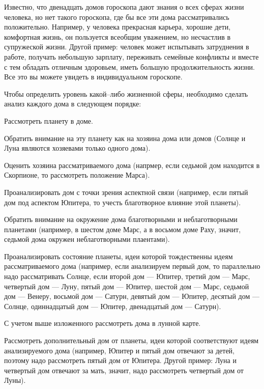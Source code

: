 Известно, что двенадцать домов гороскопа дают знания о всех сферах жизни человека, но нет такого гороскопа, где бы все эти дома рассматривались положительно. Например, у человека прекрасная карьера, хорошие дети, комфортная жизнь, он пользуется всеобщим уважением, но несчастлив в супружеской жизни. Другой пример: человек может испытывать затруднения в работе, получать небольшую зарплату, переживать семейные конфликты и вместе с тем обладать отличным здоровьем, иметь большую продолжительность жизни. Все это вы можете увидеть в индивидуальном гороскопе.

Чтобы определить уровень какой--либо жизненной сферы, необходимо сделать анализ каждого дома в следующем порядке:

\begin{myenum}
	\item Рассмотреть планету в доме.
	\item Обратить внимание на эту планету как на хозяина дома или домов (Солнце и Луна являются хозяевами только одного дома).
	\item Оценить хозяина рассматриваемого дома (напрмер, если седьмой дом находится в Скорпионе, то рассмотреть положение Марса).
	\item Проанализировать дом с точки зрения аспектной связи (например, если пятый дом под аспектом Юпитера, то учесть благотворное влияние этой планеты).
	\item Обратить внимание на окружение дома благотворными и неблаготворными планетами (например, в шестом доме Марс, а в восьмом доме Раху, значит, седьмой дома окружен неблаготворными плаентами).
	\item Проанализировать состояние планеты, идеи которой тождественны идеям рассматриваемого дома (например, если анализируем первый дом, то параллельно надо рассматривать Солнце, если второй дом --- Юпитер, третий дом --- Марс, четвертый дом --- Луну, пятый дом --- Юпитер, шестой дом --- Марс, седьмой дом --- Венеру, восьмой дом --- Сатурн, девятый дом --- Юпитер, десятый дом --- Солнце, одиннадцатый дом --- Юпитер, двенадцатый дом --- Сатурн).
	\item С учетом выше изложенного рассмотреть дома в лунной карте.
	\item Рассмотреть дополнительный дом от планеты, идеи которой соответствуют идеям анализируемого дома (например, Юпитер и пятый дом отвечают за детей, поэтому надо рассмотреть пятый дом от Юпитера. Другой пример: Луна и четвертый дом отвечают за мать, значит, надо рассмотреть четвертый дом от Луны).
\end{myenum}

